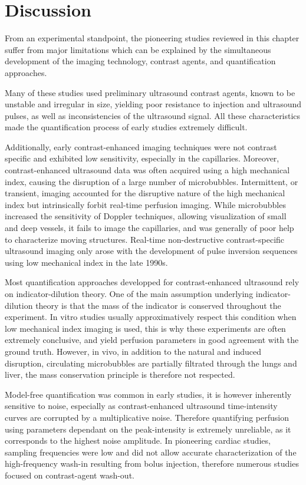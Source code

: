 \section{Discussion}
From an experimental standpoint, the pioneering studies reviewed in this chapter suffer from major limitations which can be explained by the simultaneous development of the imaging technology, contrast agents, and quantification approaches.

Many of these studies used preliminary ultrasound contrast agents, known to be unstable and irregular in size, yielding poor resistance to injection and ultrasound pulses, as well as inconsistencies of the ultrasound signal.
All these characteristics made the quantification process of early studies extremely difficult.

Additionally, early contrast-enhanced imaging techniques were not contrast specific and exhibited low sensitivity, especially in the capillaries.
Moreover, contrast-enhanced ultrasound data was often acquired using a high mechanical index, causing the disruption of a large number of microbubbles.
Intermittent, or transient, imaging accounted for the disruptive nature of the high mechanical index but intrinsically forbit real-time perfusion imaging.
While microbubbles increased the sensitivity of Doppler techniques, allowing visualization of small and deep vessels, it fails to image the capillaries, and was generally of poor help to characterize moving structures.
Real-time non-destructive contrast-specific ultrasound imaging only arose with the development of pulse inversion sequences using low mechanical index in the late 1990s.

Most quantification approaches developped for contrast-enhanced ultrasound rely on indicator-dilution theory.
One of the main assumption underlying indicator-dilution theory is that the mass of the indicator is conserved throughout the experiment.
In vitro studies usually approximatively respect this condition when low mechanical index imaging is used, this is why these experiments are often extremely conclusive, and yield perfusion parameters in good agreement with the ground truth. 
However, in vivo, in addition to the natural and induced disruption, circulating microbubbles are partially filtrated through the lungs and liver, the mass conservation principle is therefore not respected.

Model-free quantification was common in early studies, it is however inherently sensitive to noise, especially as contrast-enhanced ultrasound time-intensity curves are corrupted by a multiplicative noise.
Therefore quantifying perfusion using parameters dependant on the peak-intensity is extremely unreliable, as it corresponds to the highest noise amplitude.
In pioneering cardiac studies, sampling frequencies were low and did not allow accurate characterization of the high-frequency wash-in resulting from bolus injection, therefore numerous studies focused on contrast-agent wash-out.

